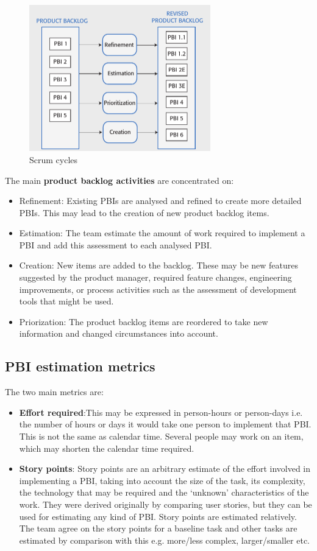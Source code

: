 \documentclass[10pt,a4paper]{report}
\begin{document}
\begin{figure}[h]
	\centering
	\includegraphics[width=0.7\textwidth]{image10}
	\caption{Scrum cycles}
	\label{image10}
\end{figure}
 
The main \textbf{product backlog activities} are concentrated on:
\begin{itemize}
	\item Refinement: Existing PBIs are analysed and refined to create more detailed PBIs. This may
	lead to the creation of new product backlog items.
	\item Estimation: The team estimate the amount of work required to implement a PBI and add this
	assessment to each analysed PBI.
	\item Creation: New items are added to the backlog. These may be new features suggested by
	the product manager, required feature changes, engineering improvements, or process activities such as the assessment of development tools that might be used.
	\item Priorization: The product backlog items are reordered to take new information and changed
	circumstances into account.
\end{itemize} 
 
\subsection{PBI estimation metrics}
The two main metrics are:
\begin{itemize}
	\item \textbf{Effort required}:This may be expressed in person-hours or person-days i.e. the number of hours or days it would take one person to implement that PBI. This is not the same as
	calendar time. Several people may work on an item, which may shorten the
	calendar time required.
	
	\item \textbf{Story points}: Story points are an arbitrary estimate of the effort involved in implementing a PBI, taking into account the size of the task, its complexity, the technology that
	may be required and the ‘unknown’ characteristics of the work.
	They were derived originally by comparing user stories, but they can be used for
	estimating any kind of PBI. Story points are estimated relatively. The team agree on the story points for a baseline task and other tasks are estimated by comparison with this e.g. more/less complex, larger/smaller etc.
\end{itemize}
\end{document}
